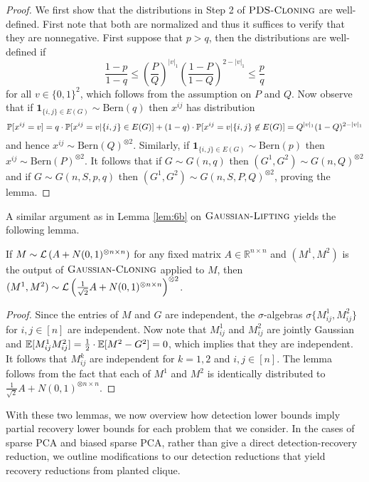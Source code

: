 \begin{proof}
We first show that the distributions in Step 2 of $\textsc{PDS-Cloning}$ are well-defined. First note that both are normalized and thus it suffices to verify that they are nonnegative. First suppose that $p > q$, then the distributions are well-defined if
$$\frac{1 - p}{1 - q} \le \left( \frac{P}{Q} \right)^{|v|_1} \left( \frac{1 - P}{1 - Q} \right)^{2 - |v|_1} \le \frac{p}{q}$$
for all $v \in \{0, 1\}^2$, which follows from the assumption on $P$ and $Q$. Now observe that if $\mathbf{1}_{\{i, j \} \in E(G)} \sim \text{Bern}(q)$ then $x^{ij}$ has distribution
$$\mathbb{P}[x^{ij} = v] = q \cdot \mathbb{P}[x^{ij} = v | \{i, j\} \in E(G)] + (1 - q) \cdot \mathbb{P}[x^{ij} = v | \{i, j\} \not \in E(G)] = Q^{|v|_1}(1 - Q)^{2 - |v|_1}$$
and hence $x^{ij} \sim \text{Bern}(Q)^{\otimes 2}$. Similarly, if $\mathbf{1}_{\{i, j \} \in E(G)} \sim \text{Bern}(p)$ then $x^{ij} \sim \text{Bern}(P)^{\otimes 2}$. It follows that if $G \sim G(n, q)$ then $(G^1, G^2) \sim G(n, Q)^{\otimes 2}$ and if $G \sim G(n, S, p, q)$ then $(G^1, G^2) \sim G(n, S, P, Q)^{\otimes 2}$, proving the lemma.
\end{proof}

A similar argument as in Lemma \ref{lem:6b} on $\textsc{Gaussian-Lifting}$ yields the following lemma.

\begin{lemma} \label{lem:gausscloning}
If $M \sim \mathcal{L}\left( A + N(0, 1)^{\otimes n \times n} \right)$ for any fixed matrix $A \in \mathbb{R}^{n \times n}$ and $(M^1, M^2)$ is the output of $\textsc{Gaussian-Cloning}$ applied to $M$, then $(M^1, M^2) \sim \mathcal{L}\left( \frac{1}{\sqrt{2}} A + N(0, 1)^{\otimes n \times n} \right)^{\otimes 2}$.
\end{lemma}

\begin{proof}
Since the entries of $M$ and $G$ are independent, the $\sigma$-algebras $\sigma \{ M^1_{ij}, M^2_{ij} \}$ for $i, j \in [n]$ are independent. Now note that $M^1_{ij}$ and $M^2_{ij}$ are jointly Gaussian and $\mathbb{E}[M^1_{ij} M^2_{ij}] = \frac{1}{2} \cdot \mathbb{E}[M^2 - G^2] = 0$, which implies that they are independent. It follows that $M^k_{ij}$ are independent for $k = 1, 2$ and $i, j \in [n]$. The lemma follows from the fact that each of $M^1$ and $M^2$ is identically distributed to $\frac{1}{\sqrt{2}} A + N(0, 1)^{\otimes n \times n}$. 
\end{proof}

With these two lemmas, we now overview how detection lower bounds imply partial recovery lower bounds for each problem that we consider. In the cases of sparse PCA and biased sparse PCA, rather than give a direct detection-recovery reduction, we outline modifications to our detection reductions that yield recovery reductions from planted clique. 

